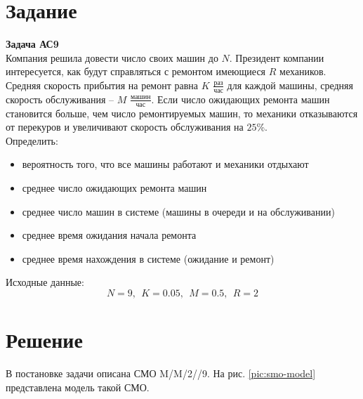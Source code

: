 





\section{Задание}

\textbf{Задача АС9}\\

Компания решила довести число своих машин до $N$. Президент компании интересуется, как будут справляться с ремонтом имеющиеся $R$ механиков. Средняя скорость прибытия на ремонт равна $K$ $\frac{\text{раз}}{\text{час}}$ для каждой машины, средняя скорость обслуживания – $M$  $\frac{\text{машин}}{\text{час}}$. Если число ожидающих ремонта машин становится больше, чем число ремонтируемых машин, то механики отказываются от перекуров и увеличивают скорость обслуживания на $25$\%.\\

Определить:
\begin{itemize}
	\item вероятность того, что все машины работают и механики отдыхают
	\item среднее число ожидающих ремонта машин
	\item среднее число машин в системе (машины в очереди и на обслуживании)
	\item среднее время ожидания начала ремонта
	\item среднее время нахождения в системе (ожидание и ремонт)
\end{itemize}

Исходные данные:\\

\begin{equation*}
	N = 9,\ \ K = 0.05,\ \ M = 0.5,\ \ R = 2
\end{equation*}

\section{Решение}

В постановке задачи описана СМО M/M/2//9. На рис. \ref{pic:smo-model} представлена модель такой СМО.



